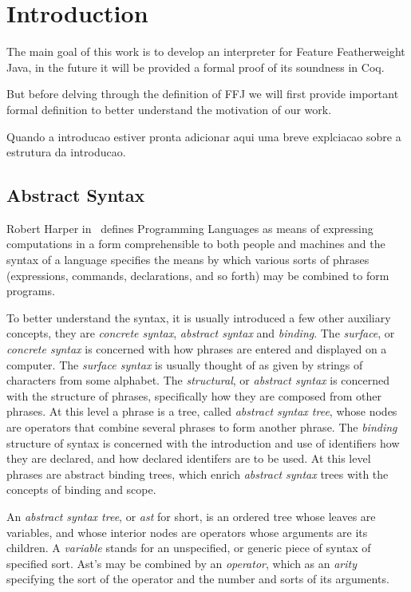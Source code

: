 \chapter{Introduction}

The main goal of this work is to develop an interpreter for Feature
Featherweight Java, in the future it will be provided a formal proof of its
soundness in Coq.

But before delving through the definition of FFJ we will first provide
important formal definition to better understand the motivation of our work.

Quando a introducao estiver pronta adicionar aqui uma breve explciacao sobre a
estrutura da introducao.

\section{Abstract Syntax}
Robert Harper in~\cite{practicalFoundations} defines Programming Languages
as means of expressing computations in a form comprehensible to
both people and machines and the syntax of a language specifies the means
by which various sorts of phrases (expressions, commands, declarations, and
so forth) may be combined to form programs.

To better understand the syntax, it is usually introduced a few other auxiliary
concepts, they are \textit{concrete syntax}, \textit{abstract syntax} and
\textit{binding}.
The \textit{surface}, or \textit{concrete syntax} is concerned with how
phrases are entered and displayed on a computer. The \textit{surface
syntax} is usually thought of as given by strings of characters from some
alphabet. 
The \textit{structural}, or \textit{abstract syntax} is concerned
with the structure of phrases, specifically how they are composed from
other phrases. 
At this level a phrase is a tree, called \textit{abstract
syntax tree}, whose nodes are operators that combine several phrases to
form another phrase. The \textit{binding} structure of syntax is concerned
with the introduction and use of identifiers how they are declared, and how
declared identifers are to be used. At  this level phrases are abstract
binding trees, which enrich \textit{abstract syntax} trees with the
concepts of binding and scope.

An \textit{abstract syntax tree}, or \textit{ast} for short, is an
ordered tree whose leaves are variables, and whose interior nodes are
operators whose arguments are its children. A \textit{variable} stands
for an unspecified, or generic piece of syntax of specified sort. Ast's
may be combined by an \textit{operator}, which as an \textit{arity}
specifying the sort of the operator and the number and sorts of its
arguments. 

